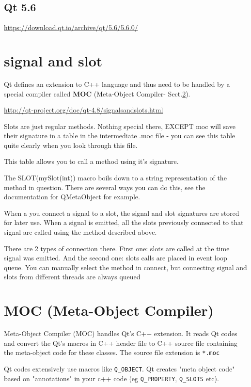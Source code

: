 \subsection{Qt 5.6}


\url{https://download.qt.io/archive/qt/5.6/5.6.0/}


\section{signal and slot}
\label{sec:signal_and_slot}

Qt defines an extension to C++ language and thus need to be handled by a special
compiler called {\bf MOC} (Meta-Object Compiler- Sect.\ref{sec:MOC}).

\url{http://qt-project.org/doc/qt-4.8/signalsandslots.html}


Slots are just regular methods. Nothing special there, EXCEPT moc will save
their signature in a table in the intermediate .moc file - you can see this
table quite clearly when you look through this file.

This table allows you to call a method using it's signature.

The SLOT(mySlot(int)) macro boils down to a string representation of the method
in question. There are several ways you can do this, see the documentation for
QMetaObject for example.

When a you connect a signal to a slot, the signal and slot signatures are stored
for later use. When a signal is emitted, all the slots previously connected to
that signal are called using the method described above.

There are 2 types of connection there. First one: slots are called at the time
signal was emitted. And the second one: slots calls are placed in event loop
queue. You can manually select the method in connect, but connecting signal and
slots from different threads are always queued


\section{MOC (Meta-Object Compiler)}
\label{sec:MOC}

Meta-Object Compiler (MOC) handles Qt's C++ extension.
It reads Qt codes and convert the Qt's macros in C++ header file to C++ source
file containing the meta-object code for these classes. The source file
extension is \verb!*.moc!

Qt codes extensively use macros like \verb!Q_OBJECT!.
Qt creates "meta object code" based on "annotations" in your c++ code (eg
\verb!Q_PROPERTY!, \verb!Q_SLOTS! etc).


